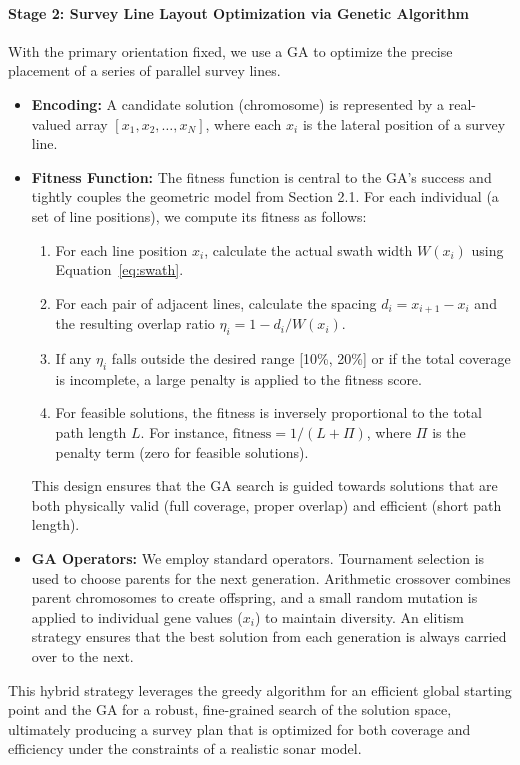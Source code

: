 \documentclass[compress]{cm}
\begin{document}
\paragraph{Stage 2: Survey Line Layout Optimization via Genetic Algorithm}
With the primary orientation fixed, we use a GA to optimize the precise placement of a series of parallel survey lines.
\begin{itemize}
    \item \textbf{Encoding:} A candidate solution (chromosome) is represented by a real-valued array $[x_1, x_2, \ldots, x_N]$, where each $x_i$ is the lateral position of a survey line.
    \item \textbf{Fitness Function:} The fitness function is central to the GA's success and tightly couples the geometric model from Section 2.1. For each individual (a set of line positions), we compute its fitness as follows:
    \begin{enumerate}
        \item For each line position $x_i$, calculate the actual swath width $W(x_i)$ using Equation~\eqref{eq:swath}.
        \item For each pair of adjacent lines, calculate the spacing $d_i = x_{i+1} - x_i$ and the resulting overlap ratio $\eta_i = 1 - d_i/W(x_i)$.
        \item If any $\eta_i$ falls outside the desired range [10\%, 20\%] or if the total coverage is incomplete, a large penalty is applied to the fitness score.
        \item For feasible solutions, the fitness is inversely proportional to the total path length $L$. For instance, $\text{fitness} = 1 / (L + \Pi)$, where $\Pi$ is the penalty term (zero for feasible solutions).
    \end{enumerate}
    This design ensures that the GA search is guided towards solutions that are both physically valid (full coverage, proper overlap) and efficient (short path length).
    \item \textbf{GA Operators:} We employ standard operators. Tournament selection is used to choose parents for the next generation. Arithmetic crossover combines parent chromosomes to create offspring, and a small random mutation is applied to individual gene values ($x_i$) to maintain diversity. An elitism strategy ensures that the best solution from each generation is always carried over to the next.
\end{itemize}
This hybrid strategy leverages the greedy algorithm for an efficient global starting point and the GA for a robust, fine-grained search of the solution space, ultimately producing a survey plan that is optimized for both coverage and efficiency under the constraints of a realistic sonar model.
\end{document}
